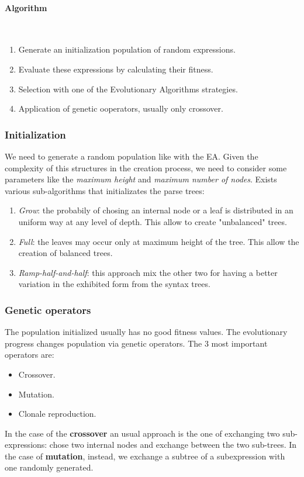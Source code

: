 \documentclass{article}
\begin{document}
\paragraph{Algorithm}\mbox{}\\
\begin{enumerate}
    \item Generate an initialization population of random expressions.
    \item Evaluate these expressions by calculating their fitness.
    \item Selection with one of the Evolutionary Algorithms strategies.
    \item Application of genetic ooperators, usually only crossover.
\end{enumerate}

\subsubsection{Initialization}
We need to generate a random population like with the EA. Given the complexity of this structures
in the creation process, we need to consider some parameters like the \textit{maximum height}
and \textit{maximum number of nodes}. Exists various sub-algorithms that initializates
the parse trees:
\begin{enumerate}
    \item \textit{Grow}: the probabily of chosing an internal node or a leaf is distributed
    in an uniform way at any level of depth. This allow to create "unbalanced" trees.

    \item \textit{Full}: the leaves may occur only at maximum height of the tree. This allow
    the creation of balanced trees.

    \item \textit{Ramp-half-and-half}: this approach mix the other two for having a better
    variation in the exhibited form from the syntax trees.
\end{enumerate}

\subsubsection{Genetic operators}
The population initialized usually has no good fitness values. The evolutionary progress
changes population via genetic operators. The 3 most important operators are:
\begin{itemize}
    \item Crossover.
    \item Mutation.
    \item Clonale reproduction.
\end{itemize}
In the case of the \textbf{crossover} an usual approach is the one of exchanging two sub-expressions:
chose two internal nodes and exchange between the two sub-trees.
In the case of \textbf{mutation}, instead, we exchange a subtree of a subexpression
with one randomly generated.
\end{document}
